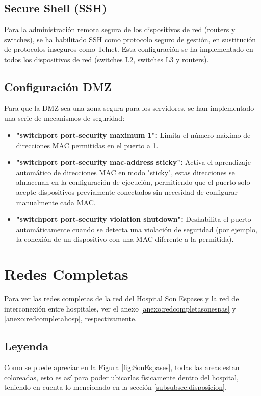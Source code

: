 \subsection{Secure Shell (SSH)}
Para la administración remota segura de los dispositivos de red (routers y switches), se ha habilitado SSH como protocolo seguro de gestión, en sustitución de protocolos inseguros como Telnet. 
Esta configuración se ha implementado en todos los dispositivos de red (switches L2, switches L3 y routers). 

\subsection{Configuración DMZ}\label{subsec:dmz}
Para que la DMZ sea una zona segura para los servidores, se han implementado una serie de mecanismos de seguridad:
\begin{itemize}
    \item \textbf{"switchport port-security maximum 1":} Limita el número máximo de direcciones \ac{MAC} permitidas en el puerto a 1.
    \item \textbf{"switchport port-security mac-address sticky":} Activa el aprendizaje automático de direcciones MAC en modo "sticky", estas direcciones se almacenan en la configuración de ejecución, permitiendo que el puerto solo acepte dispositivos previamente conectados sin necesidad de configurar manualmente cada MAC.
    \item \textbf{"switchport port-security violation shutdown":} Deshabilita el puerto automáticamente cuando se detecta una violación de seguridad (por ejemplo, la conexión de un dispositivo con una MAC diferente a la permitida).
\end{itemize}

\section{Redes Completas}

Para ver las redes completas de la red del Hospital Son Espases y la red de interconexión entre hospitales, ver el anexo \ref{anexo:redcompletasonespas} y \ref{anexo:redcompletahosp}, respectivamente.

\subsection{Leyenda}
Como se puede apreciar en la Figura \ref{fig:SonEspases}, todas las areas estan coloreadas, esto es así para poder 
ubicarlas físicamente dentro del hospital, teniendo en cuenta lo mencionado en la sección \ref{subsubsec:disposicion}. 

